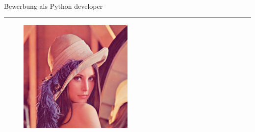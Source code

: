 \documentclass[a4paper]{article}%
\begin{document}
%
\normalsize%
\
        \setmainfont[
            Path = fonts/,
            Extension = .otf,
            UprightFont = *
        ]{Fontin}
\vspace*{10mm}%
\begin{center}%
\begin{Huge}%
Bewerbung als Python developer%
\end{Huge}%
\end{center}%
\noindent\rule{\textwidth}{1pt}%
\newline%
\vspace*{40mm}%


\begin{figure}[!ht]%
\centering%
\includegraphics[width=0.5\textwidth]{images/passphoto}%
\end{figure}
\end{document}
